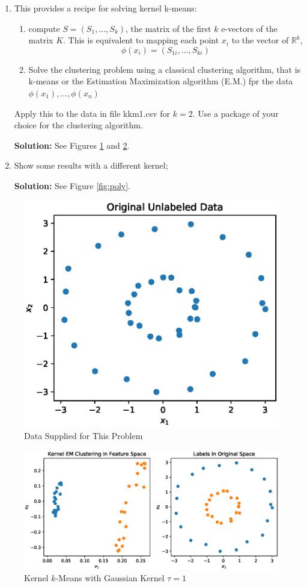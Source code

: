 \documentclass{article}[12pt]
\begin{document}
\begin{enumerate}
 \item This provides a recipe for solving kernel k-means: 
 \begin{enumerate}
 \item compute $S=(S_1,\ldots,S_k)$, the matrix of the first $k$ e-vectors of the matrix $K$. This is equivalent to mapping each point $x_i$ to the vector of $\mathbb{R}^k$, 
 \begin{equation}
 \phi(x_i)=(S_{1i},\ldots,S_{ki})
 \end{equation}
 \item Solve the clustering problem using a classical clustering algorithm, that is k-means or the Estimation Maximization algorithm (E.M.) fpr the data $\phi(x_1),\ldots,\phi(x_n)$
 \end{enumerate}
 Apply this to the data in file \mbox{kkm1.csv} for $k=2$. Use a package of your choice for the clustering algorithm. 
 
 \textbf{Solution:} See Figures \ref{fig:orig} and \ref{fig:gauss}.

 \item Show some results with a different kernel;

	 \textbf{Solution:} See Figure \ref{fig:poly}.
\end{enumerate}  

\begin{figure}[h]
	\centering
	\includegraphics[width=0.4\linewidth]{img/original_data.eps}
	\caption{Data Supplied for This Problem}%
	\label{fig:orig}
\end{figure}

\begin{figure}[h]
	\centering
	\includegraphics[width=0.8\linewidth]{./img/gaussian_1.eps}
	\caption{Kernel $k$-Means with Gaussian Kernel $\tau=1$}%
	\label{fig:gauss}
\end{figure}
\end{document}
